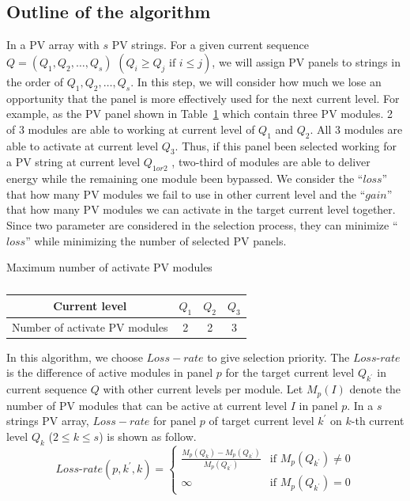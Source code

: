 \documentclass[journal]{IEEEtran}
\begin{document}
\subsection{Outline of the algorithm}\label{sec:outline-algorithm}
In a PV array with $s$ PV strings.
For a given current sequence $Q = (Q_{1},Q_{2},\ldots ,Q_{s})$ $(Q_{i} \geq Q_{j} \mbox{\ if\ } i \leq j)$, we will assign PV panels to strings in the order of $Q_{1},Q_{2},\ldots ,Q_{s}$.
In this step, we will consider how much we lose an opportunity that the panel is more effectively used for the next current level.
For example, as the PV panel shown in Table~\ref{tab:NumofModules} which contain three PV modules.
2 of 3 modules are able to working at current level of $Q_{1}$ and $Q_{2}$.
All 3 modules are able to activate at current level $Q_{3}$.
Thus, if this panel been selected working for a PV string at current level $Q_{1 or 2}$ , two-third of modules are able to deliver energy while the remaining one module been bypassed.
We consider the ``$loss$'' that how many PV modules we fail to use in other current level and the ``$gain$'' that how many PV modules we can activate in the target current level together.
Since two parameter are considered in the selection process, they can minimize ``$loss$'' while minimizing the number of selected PV panels.
\begin{table}[tbp]
  \caption[]{}
  \label{tab:NumofModules} 
  \centerline{Maximum number of activate PV modules}
  \vskip5pt
  \begin{center}
  \begin{tabular}{c|c|c|c}
    \hline
    Current level                 & $Q_{1}$ & $Q_{2}$ & $Q_{3}$  \\ \hline
    Number of activate PV modules & 2  & 2    & 3        \\ \hline
  \end{tabular}
  \end{center}
\end{table}
In this algorithm, we choose $Loss-rate$ to give selection priority.
The $Loss$-$rate$ is the difference of active modules in panel $p$ for the target current level $Q_{k^{'}}$  in current sequence $Q$ with other current levels per module.
Let $M_{p}(I)$ denote the number of PV modules that can be active at current level $I$ in panel $p$.
In a $s$ strings PV array, $Loss-rate$ for panel $p$ of target current level $k^{'}$ on $k$-th current level $Q_{k}$ ($2 \leq k \leq s$) is shown as follow.
\begin{equation}\label{eq:4}
    Loss\mbox{-}rate(p,k^{'},k) =
    \begin{cases}
    \frac{M_{p}(Q_{k})-M_{p}(Q_{k^{'}})}{M_{p}(Q_{k^{'}})} & \mbox{if } M_{p}(Q_{k^{'}}) \neq 0 \\
    \infty & \mbox{if } M_{p}(Q_{k^{'}}) = 0
  \end{cases}
\end{equation}
\end{document}
